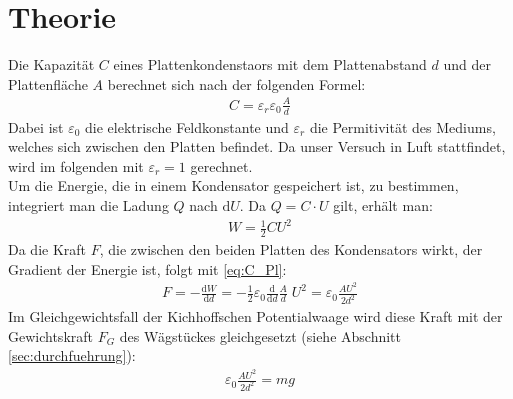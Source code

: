 \documentclass[12pt,a4paper,titlepage,headinclude,bibtotoc]{scrartcl}
\newcommand{\dif}{\ensuremath{\mathrm{d}}}
\begin{document}
\section{Theorie}
\label{sec:theorie}
Die Kapazität $C$ eines Plattenkondenstaors mit dem Plattenabstand $d$ und der Plattenfläche $A$ berechnet sich nach der folgenden Formel:
\begin{align}
 C=\varepsilon_r\varepsilon_0\frac{A}{d}
 \label{eq:C_Pl}
\end{align}
Dabei ist $\varepsilon_0$ die elektrische Feldkonstante und $\varepsilon_r$ die Permitivität des Mediums, welches sich zwischen den Platten befindet.
Da unser Versuch in Luft stattfindet, wird im folgenden mit $\varepsilon_r=1$ gerechnet.\\
Um die Energie, die in einem Kondensator gespeichert ist, zu bestimmen, integriert man die Ladung $Q$ nach $\dif U$.
Da $Q=C\cdot U$ gilt, erhält man:
\begin{align}
 W=\frac{1}{2} C U^2
\end{align}
Da die Kraft $F$, die zwischen den beiden Platten des Kondensators wirkt, der Gradient der Energie ist, folgt mit \eqref{eq:C_Pl}:
\begin{align}
 F=-\frac{\dif W}{\dif d}= -\frac{1}{2}\varepsilon_0\frac{\dif}{\dif d}\frac{A}{d} \;U^2 =\varepsilon_0\frac{A U^2}{2 d^2}
 \label{eq:F_Pl}
\end{align}
Im Gleichgewichtsfall der Kichhoffschen Potentialwaage wird diese Kraft mit der Gewichtskraft $F_G$ des Wägstückes gleichgesetzt (siehe Abschnitt \ref{sec:durchfuehrung}):
\begin{align}
 \varepsilon_0\frac{A U^2}{2 d^2}=mg
 \label{eq:PotWaage}
\end{align}
\end{document}
